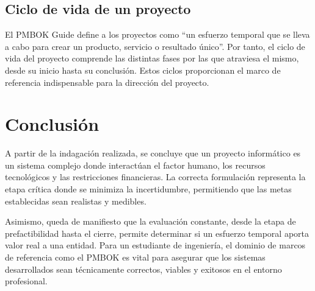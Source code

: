 \documentclass[12pt]{article}
\begin{document}
\subsection{Ciclo de vida de un proyecto}
El PMBOK\cite{estruga2025guia} Guide define a los proyectos como “un esfuerzo temporal que se lleva a cabo para crear un producto, servicio o resultado único”. Por tanto, el ciclo de vida del proyecto comprende las distintas fases por las que atraviesa el mismo, desde su inicio hasta su conclusión. Estos ciclos proporcionan el marco de referencia indispensable para la dirección del proyecto.

\section{Conclusión}
A partir de la indagación realizada, se concluye que un proyecto informático es un sistema complejo donde interactúan el factor humano, los recursos tecnológicos y las restricciones financieras. La correcta formulación representa la etapa crítica donde se minimiza la incertidumbre, permitiendo que las metas establecidas sean realistas y medibles.

Asimismo, queda de manifiesto que la evaluación constante, desde la etapa de prefactibilidad hasta el cierre, permite determinar si un esfuerzo temporal aporta valor real a una entidad. Para un estudiante de ingeniería, el dominio de marcos de referencia como el PMBOK es vital para asegurar que los sistemas desarrollados sean técnicamente correctos, viables y exitosos en el entorno profesional.

\newpage
 
 
\end{document}
